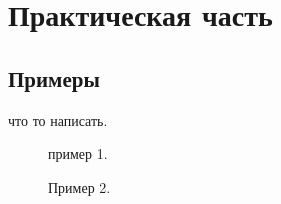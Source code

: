 \section{Практическая часть}
\subsection{Примеры}
что то написать.
\begin{figure}[h!]
\caption{пример 1.}
\label{glass}
\end{figure}

\begin{figure}[h!]
\caption{Пример 2.}
\label{map}
\end{figure}

